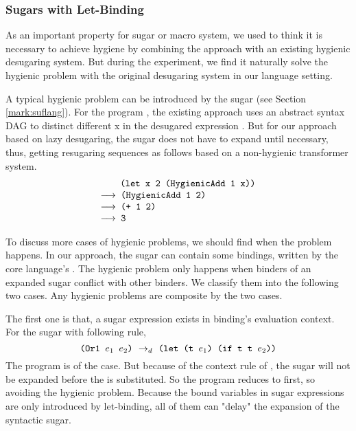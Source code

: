 \subsubsection{Sugars with Let-Binding}
\label{mark:hygienic}

As an important property for sugar or macro system, we used to think it is necessary to achieve hygiene by combining the approach with an existing hygienic desugaring system. But during the experiment, we find it naturally solve the hygienic problem with the original desugaring system in our language setting.

A typical hygienic problem can be introduced by the sugar  (see Section \ref{mark:suflang}). For the program , the existing approach uses an abstract syntax DAG to distinct different x in the desugared expression . But for our approach based on lazy desugaring, the  sugar does not have to expand until necessary, thus, getting resugaring sequences as follows based on a non-hygienic transformer system.
\[
	\begin{array}{l}
		\quad\;\;\Code{ (let x 2 (HygienicAdd 1 x))}\\
		\OneStep{ \Code{ (HygienicAdd 1 2)}}\\
		\OneStep{ \Code{ (+ 1 2)}}\\
		\OneStep{ \Code{ 3}}
	\end{array}
\]

 To discuss more cases of hygienic problems, we should find when the problem happens. In our approach, the sugar can contain some bindings, written by the core language's . The hygienic problem only happens when binders of an expanded sugar conflict with other binders. We classify them into the following two cases. Any hygienic problems are composite by the two cases.

The first one is that, a sugar expression exists in binding's evaluation context. For the sugar  with following rule,
\[\texttt{(Or1~$e_1$~$e_2$)} ~\rightarrow_d~ \texttt{(let (t $e_1$) (if t t $e_2$))}\]
The program  is of the case. But because of the context rule of , the sugar  will not be expanded before the  is substituted. So the program reduces to  first, so avoiding the hygienic problem. Because the bound variables in sugar expressions are only introduced by let-binding, all of them can "delay" the expansion of the syntactic sugar.


